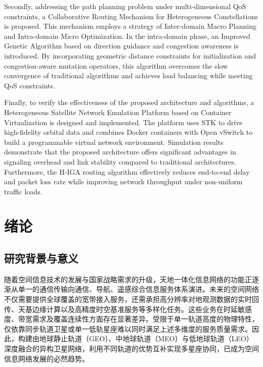 \documentclass[print, master, vlined]{DissertUESTC}
\begin{document}
    Secondly, addressing the path planning problem under multi-dimensional QoS constraints, a Collaborative Routing Mechanism for Heterogeneous Constellations is proposed. This mechanism employs a strategy of Inter-domain Macro Planning and Intra-domain Micro Optimization. In the intra-domain phase, an Improved Genetic Algorithm based on direction guidance and congestion awareness is introduced. By incorporating geometric distance constraints for initialization and congestion-aware mutation operators, this algorithm overcomes the slow convergence of traditional algorithms and achieves load balancing while meeting QoS constraints.
    
    Finally, to verify the effectiveness of the proposed architecture and algorithms, a Heterogeneous Satellite Network Emulation Platform based on Container Virtualization is designed and implemented. The platform uses STK to drive high-fidelity orbital data and combines Docker containers with Open vSwitch to build a programmable virtual network environment. Simulation results demonstrate that the proposed architecture offers significant advantages in signaling overhead and link stability compared to traditional architectures. Furthermore, the H-IGA routing algorithm effectively reduces end-to-end delay and packet loss rate while improving network throughput under non-uniform traffic loads.

	
	\tableofcontents  %

	\chapter{绪论}
    \section{研究背景与意义}

    随着空间信息技术的发展与国家战略需求的升级，天地一体化信息网络的功能正逐渐从单一的通信传输向通信、导航、遥感综合信息服务体系演进。未来的空间网络不仅需要提供全球覆盖的宽带接入服务，还需承担高分辨率对地观测数据的实时回传、天基边缘计算以及高精度时空基准服务等多样化任务。这些业务在时延敏感度、带宽需求及覆盖连续性方面存在显著差异。受限于单一轨道高度的物理特性，仅依靠同步轨道卫星或单一低轨星座难以同时满足上述多维度的服务质量需求。因此，构建由地球静止轨道（GEO）、中地球轨道（MEO）与低地球轨道（LEO）深度融合的异构卫星网络，利用不同轨道的优势互补实现多星座协同，已成为空间信息网络发展的必然趋势。
\end{document}
